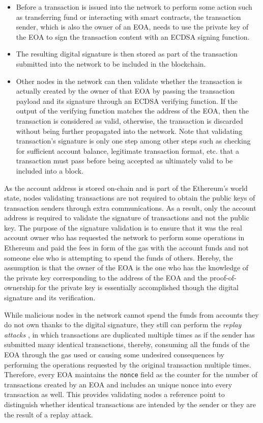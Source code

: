 \begin{itemize}
	\item Before a transaction is issued into the network to perform some action such as transferring fund or interacting with smart contracts, the transaction sender, which is also the owner of an EOA, needs to use the private key of the EOA to sign the transaction content with an ECDSA signing function.
	\item The resulting digital signature is then stored as part of the transaction submitted into the network to be included in the blockchain.
	\item Other nodes in the network can then validate whether the transaction is actually created by the owner of that EOA by passing the transaction payload and its signature through an ECDSA verifying function. If the output of the verifying function matches the address of the EOA, then the transaction is considered as valid, otherwise, the transaction is discarded without being further propagated into the network. Note that validating transaction's signature is only one step among other steps such as checking for sufficient account balance, legitimate transaction format, etc. that a transaction must pass before being accepted as ultimately valid to be included into a block.
\end{itemize}

As the account address is stored on-chain and is part of the Ethereum's world state, nodes validating transactions are not required to obtain the public keys of transaction senders through extra communications. As a result, only the account address is required to validate the signature of transactions and not the public key. The purpose of the signature validation is to ensure that it was the real account owner who has requested the network to perform some operations in Ethereum and paid the fees in form of the gas with the account funds and not someone else who is attempting to spend the funds of others. Hereby, the assumption is that the owner of the EOA is the one who has the knowledge of the private key corresponding to the address of the EOA and the proof-of-ownership for the private key is essentially accomplished though the digital signature and its verification.

While malicious nodes in the network cannot spend the funds from accounts they do not own thanks to the digital signature, they still can perform the \textit{replay attacks} \cite{malladi2002preventing}, in which transactions are duplicated multiple times as if the sender has submitted many identical transactions, thereby, consuming all the funds of the EOA through the gas used or causing some undesired consequences by performing the operations requested by the original transaction multiple times. Therefore, every EOA maintains the \texttt{nonce} field as the counter for the number of transactions created by an EOA and includes an unique nonce into every transaction as well. This provides validating nodes a reference point to distinguish whether identical transactions are intended by the sender or they are the result of a replay attack.

